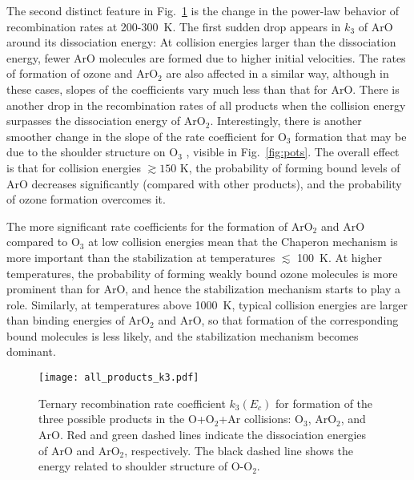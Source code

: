 \documentclass[aps,prl,twocolumn,showpacs,preprintnumbers,amsmath,amssymb,floatfix]{revtex4-2}
\begin{document}
The second distinct feature in Fig.~\ref{fig:k3T_allP} is the change in the power-law behavior of recombination rates at 200-300~K. The first sudden drop appears in $k_3$ of ArO around its dissociation energy: At collision energies larger than the dissociation energy, fewer ArO molecules are formed due to higher initial velocities. The rates of formation of ozone and ArO$_2$ are also affected in a similar way, although in these cases, slopes of the coefficients vary much less than that for ArO. There is another drop in the recombination rates of all products when the collision energy surpasses the dissociation energy of ArO$_2$. Interestingly, there is another smoother change in the slope of the rate coefficient for O$_3$ formation that may be due to the shoulder structure on O$_3$ \cite{TYU13:134307,lapierre16}, visible in Fig.~\ref{fig:pots}. The overall effect is that for collision energies $\gtrsim150$ K, the probability of forming bound levels of ArO decreases significantly (compared with other products), and the probability of ozone formation overcomes it. 

The more significant rate coefficients for the formation of  ArO$_2$ and ArO compared to O$_3$ at low collision energies mean that the Chaperon mechanism is more important than the stabilization at temperatures $\lesssim$ 100~K. At higher temperatures, the probability of forming weakly bound ozone molecules is more prominent than for ArO, and hence the stabilization mechanism starts to play a role. Similarly, at temperatures above 1000~K, typical collision energies are larger than binding energies of ArO$_2$ and ArO, so that formation of the corresponding bound molecules is less likely, and the stabilization mechanism becomes dominant. 

    \begin{figure}
	\centering
	\texttt{[image: all\_products\_k3.pdf]}
	\caption{Ternary recombination rate coefficient $k_3(E_c)$ for formation of the three possible products in the O+O$_2$+Ar collisions: O$_3$, ArO$_2$, and ArO. Red and green dashed lines indicate the dissociation energies of ArO and ArO$_2$, respectively. The black dashed line shows the energy related to shoulder structure of O-O$_2$.}
	\label{fig:k3T_allP}
    \end{figure}
    
\end{document}
